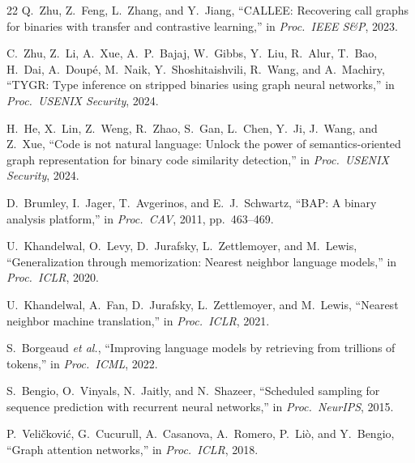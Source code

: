 \documentclass[sigconf,nonacm]{acmart}
\begin{document}
{\begin{thebibliography}{22}
Q.~Zhu, Z.~Feng, L.~Zhang, and Y.~Jiang, ``CALLEE: Recovering call graphs for binaries with transfer and contrastive learning,'' in \emph{Proc.\ IEEE S\&P}, 2023.

C.~Zhu, Z.~Li, A.~Xue, A.~P.~Bajaj, W.~Gibbs, Y.~Liu, R.~Alur, T.~Bao, H.~Dai, A.~Doup\'{e}, M.~Naik, Y.~Shoshitaishvili, R.~Wang, and A.~Machiry, ``TYGR: Type inference on stripped binaries using graph neural networks,'' in \emph{Proc.\ USENIX Security}, 2024.

H.~He, X.~Lin, Z.~Weng, R.~Zhao, S.~Gan, L.~Chen, Y.~Ji, J.~Wang, and Z.~Xue, ``Code is not natural language: Unlock the power of semantics-oriented graph representation for binary code similarity detection,'' in \emph{Proc.\ USENIX Security}, 2024.

D.~Brumley, I.~Jager, T.~Avgerinos, and E.~J.~Schwartz, ``BAP: A binary analysis platform,'' in \emph{Proc.\ CAV}, 2011, pp.~463--469.

U.~Khandelwal, O.~Levy, D.~Jurafsky, L.~Zettlemoyer, and M.~Lewis, ``Generalization through memorization: Nearest neighbor language models,'' in \emph{Proc.\ ICLR}, 2020.

U.~Khandelwal, A.~Fan, D.~Jurafsky, L.~Zettlemoyer, and M.~Lewis, ``Nearest neighbor machine translation,'' in \emph{Proc.\ ICLR}, 2021.

S.~Borgeaud \emph{et al.}, ``Improving language models by retrieving from trillions of tokens,'' in \emph{Proc.\ ICML}, 2022.

S.~Bengio, O.~Vinyals, N.~Jaitly, and N.~Shazeer, ``Scheduled sampling for sequence prediction with recurrent neural networks,'' in \emph{Proc.\ NeurIPS}, 2015.

P.~Veli\v{c}kovi\'{c}, G.~Cucurull, A.~Casanova, A.~Romero, P.~Li\`{o}, and Y.~Bengio, ``Graph attention networks,'' in \emph{Proc.\ ICLR}, 2018.

\end{thebibliography}
}
\end{document}

